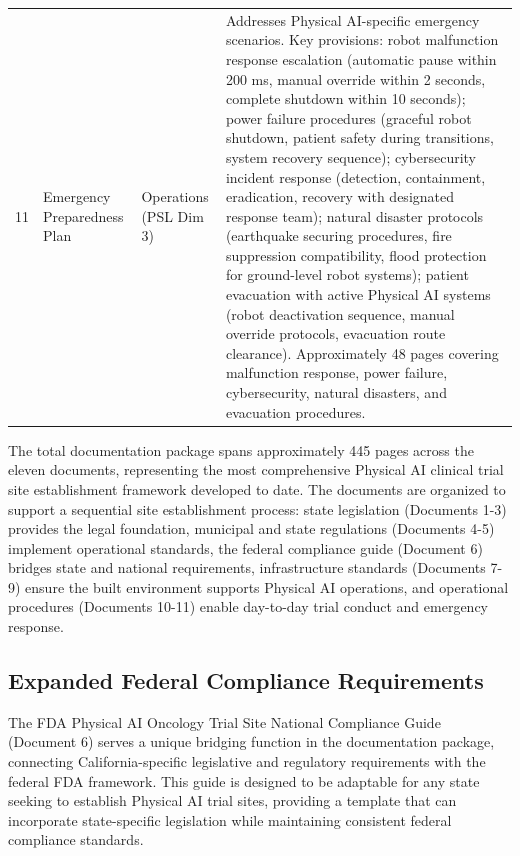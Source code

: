 \begin{longtable}{c >{\raggedright\arraybackslash}p{4.5cm} >{\raggedright\arraybackslash}p{3cm} >{\raggedright\arraybackslash}p{6.5cm}}
11 & Emergency Preparedness Plan & Operations (PSL Dim 3) & Addresses Physical AI-specific emergency scenarios. Key provisions: robot malfunction response escalation (automatic pause within 200 ms, manual override within 2 seconds, complete shutdown within 10 seconds); power failure procedures (graceful robot shutdown, patient safety during transitions, system recovery sequence); cybersecurity incident response (detection, containment, eradication, recovery with designated response team); natural disaster protocols (earthquake securing procedures, fire suppression compatibility, flood protection for ground-level robot systems); patient evacuation with active Physical AI systems (robot deactivation sequence, manual override protocols, evacuation route clearance). Approximately 48 pages covering malfunction response, power failure, cybersecurity, natural disasters, and evacuation procedures. \\
\end{longtable}

The total documentation package spans approximately 445 pages across the eleven
documents, representing the most comprehensive Physical AI clinical trial site
establishment framework developed to date. The documents are organized to
support a sequential site establishment process: state legislation (Documents
1-3) provides the legal foundation, municipal and state regulations (Documents
4-5) implement operational standards, the federal compliance guide (Document 6)
bridges state and national requirements, infrastructure standards (Documents
7-9) ensure the built environment supports Physical AI operations, and
operational procedures (Documents 10-11) enable day-to-day trial conduct and
emergency response.

\subsection{Expanded Federal Compliance Requirements}
\label{subsec:site-federal-expanded}

The FDA Physical AI Oncology Trial Site National Compliance Guide (Document 6)
serves a unique bridging function in the documentation package, connecting
California-specific legislative and regulatory requirements with the federal
FDA framework. This guide is designed to be adaptable for any state seeking to
establish Physical AI trial sites, providing a template that can incorporate
state-specific legislation while maintaining consistent federal compliance
standards.

